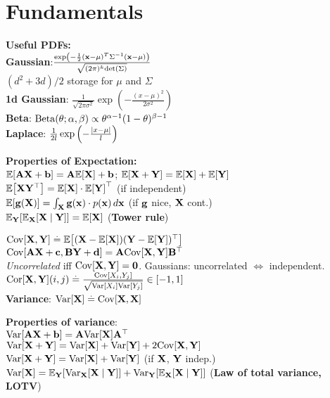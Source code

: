 \section{Fundamentals}
\begin{framed}
    \textbf{Useful PDFs:} \\
    \textbf{Gaussian}:$\frac{\exp \left(-\frac{1}{2}(\mathbf{x} - \mathbf{\mu})^T \Sigma^{-1} (\mathbf{x} - \mathbf{\mu}) \right)}{\sqrt{(2\pi)^k \mathrm{det}\left(\Sigma\right)}}$ \\
    $(d^2+3d)/2$ storage for $\mu$ and $\Sigma$ \\
    \textbf{1d Gaussian}: $\frac{1}{\sqrt{2\pi\sigma^2}} \exp\left(-\frac{(x-\mu)^2}{2\sigma^2}\right)$ \\
    \textbf{Beta}: $\Beta[\theta]{\alpha}{\beta} \propto \theta^{\alpha-1} (1-\theta)^{\beta-1}$ \\
    \textbf{Laplace}: $\frac{1}{2l}\exp\left(-\frac{\left| x - \mu \right|}{l}\right)$
\end{framed}
\begin{framed}
    \textbf{Properties of Expectation:}\\
    $\E{\mA \rX + \vb} = \mA \E{\rX} + \vb $; $ \E{\rX + \rY} = \E{\rX} + \E{\rY}$ \\
    $\E{\rX\transpose{\rY}} = \E{\rX} \cdot \transpose{\E{\rY}}$ (if independent)\\
    $\E{\vg(\rX)} = \int_{\rX} \vg(\vx) \cdot p(\vx) \,d\vx$ (if $\mathbf{g}$ nice, $\mathbf{X}$ cont.) \\
    $\E[\rY]{\E[\rX]{\rX \mid \rY}} = \E{\rX}$ (\textbf{Tower rule})
\end{framed} 
$\Cov{\rX, \rY} \defeq \E{(\rX - \E{\rX})\transpose{(\rY - \E{\rY})}}$ \\
$\Cov{\mA\rX + \vc, \mB\rY + \vd} = \mA\Cov{\rX,\rY}\transpose{\mB}$ \\
\emph{Uncorrelated} iff $\Cov{\rX, \rY} = \mzero$. Gaussians: uncorrelated $\iff$ independent. \\
$\Cor{\rX,\rY}(i,j) \defeq \frac{\Cov{X_i,Y_j}}{\sqrt{\Var{X_i} \Var{Y_j}}} \in [-1,1]$\\
\textbf{Variance}: $\Var{\rX} \defeq \Cov{\rX, \rX}$ \\
\begin{framed}
\textbf{Properties of variance}:\\
$\Var{\mA\rX + \vb} = \mA\Var{\rX}\transpose{\mA}$\\
$\Var{\rX + \rY} = \Var{\rX} + \Var{\rY} + 2 \Cov{\rX, \rY}$\\
$\Var{\rX + \rY} = \Var{\rX} + \Var{\rY}$ (if $\mathbf{X}$, $\mathbf{Y}$ indep.) \\
$\Var{\rX} = \E[\rY]{\Var[\rX]{\rX \mid \rY}} + \Var[\rY]{\E[\rX]{\rX \mid \rY}}$ (\textbf{Law of total variance, LOTV})
\end{framed}
